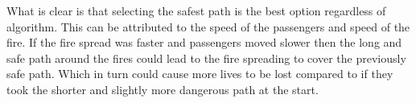 What is clear is that selecting the safest path is the best option regardless of algorithm. This can be attributed to the speed of the passengers and speed of the fire. If the fire spread was faster and passengers moved slower then the long and safe path around the fires could lead to the fire spreading to cover the previously safe path. Which in turn could cause more lives to be lost compared to if they took the shorter and slightly more dangerous path at the start.







